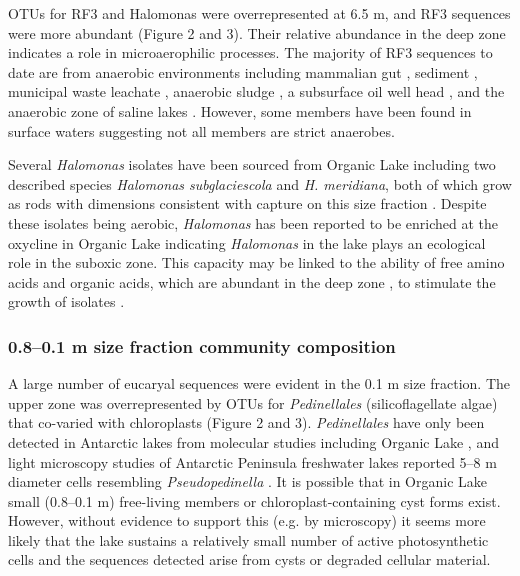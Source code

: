 \acp{OTU} for RF3 and Halomonas were overrepresented at 6.5 m, and RF3 sequences were more abundant (Figure 2 and 3). 
Their relative abundance in the deep zone indicates a role in microaerophilic processes. 
The majority of RF3 sequences to date are from anaerobic environments including mammalian gut \cite{Tajima1999, Ley2006, Samsudin2011}, sediment \cite{Yanagibayashi1999, Roske2012}, municipal waste leachate \cite{Huang2005}, anaerobic sludge \cite{Chouari2005, Goberna2009, Riviere2009, Tang2011}, a subsurface oil well head \cite{Yamane2011}, and the anaerobic zone of saline lakes \cite{Humayoun2003, Schmidtova2009, Bowman2000}. 
However, some members have been found in surface waters \cite{Demergasso2008, Xing2009, Yilmaz2012} suggesting not all members are strict anaerobes. 

Several \emph{Halomonas} isolates have been sourced from Organic Lake including two described species \emph{Halomonas subglaciescola} and \emph{H. meridiana}, both of which grow as rods with dimensions consistent with capture on this size fraction \cite{Franzmann1987a, James1990}. 
Despite these isolates being aerobic, \emph{Halomonas} has been reported to be enriched at the oxycline in Organic Lake \cite{James1994} indicating \emph{Halomonas} in the lake plays an ecological role in the suboxic zone. 
This capacity may be linked to the ability of free amino acids and organic acids, which are abundant in the deep zone \cite{Gibson1994}, to stimulate the growth of isolates \cite{Franzmann1987a}.

\subsubsection{0.8--0.1 \textmu{}m size fraction community composition}
A large number of eucaryal sequences were evident in the 0.1 \textmu{}m size fraction. 
The upper zone was overrepresented by \acp{OTU} for \emph{Pedinellales} (silicoflagellate algae) that co-varied with chloroplasts (Figure 2 and 3). 
\emph{Pedinellales} have only been detected in Antarctic lakes from molecular studies \cite{Unrein2005, Lauro2011} including Organic Lake \cite{Yau2011}, and light microscopy studies of Antarctic Peninsula freshwater lakes reported 5--8 \textmu{}m diameter cells resembling \emph{Pseudopedinella} \cite{Unrein2005}. 
It is possible that in Organic Lake small (0.8–0.1 \textmu{}m) free-living members or chloroplast-containing cyst forms \cite{Thomsen1988} exist. 
However, without evidence to support this (e.g. by microscopy) it seems more likely that the lake sustains a relatively small number of active photosynthetic cells and the sequences detected arise from cysts or degraded cellular material.

